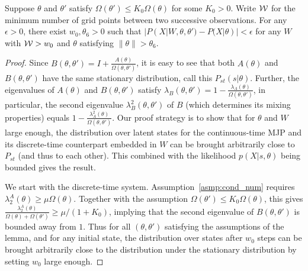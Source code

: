\begin{lemma}
Suppose $\theta$ and $\theta'$ satisfy $\Omega(\theta') \leq K_0
\Omega(\theta)$ for some $K_0 > 0$. Write ${\mathcal W}$ for the
minimum number of grid points between two successive observations.
For any $\epsilon > 0$, there exist  $w_0, \theta_6 > 0$ such that
$|P(X| W, \theta, \theta') - P(X | \theta)| < \epsilon$
for any $W$ with ${\mathcal W} > w_0$ and $\theta $ satisfying $\parallel \theta \parallel > \theta_6$.
\label{lem:eigenvalue_lemma}
\end{lemma}
\begin{proof}
Since $B(\theta, \theta') = I+\frac{A(\theta)}{\Omega(\theta, \theta')}$,
it is easy to see that both $A(\theta)$ and $B(\theta,\theta')$ have
the same stationary distribution, call this $P_{st}(s|\theta)$. Further,
the eigenvalues of $A(\theta)$ and $B(\theta,\theta')$ satisfy
$\lambda_B(\theta, \theta') = 1 - \frac{\lambda_A(\theta)}{\Omega(\theta,
\theta')}$, in particular, the second eigenvalue
$\lambda^2_B(\theta,\theta')$ of $B$ (which determines its mixing
properties) equals $1 - \frac{\lambda^2_A(\theta)}{\Omega(\theta, \theta')}$.
Our proof strategy is to show that for $\theta$ and $W$ large enough, the
distribution over latent states for the continuous-time MJP and
its discrete-time counterpart embedded in $W$ can be brought arbitrarily
close to $P_{st}$ (and thus to each other). This combined with the
likelihood $p(X|s, \theta)$ being bounded  gives the result.

We start with the discrete-time system.
Assumption~\ref{asmp:cond_num} requires
$\lambda^A_2(\theta) \geq \mu \Omega(\theta)$.
Together with the assumption $\Omega(\theta') \leq K_0 \Omega(\theta)$,
this gives
$\frac{\lambda^A_2(\theta)}{\Omega(\theta) + \Omega(\theta')} \geq
\mu / (1 + K_0) $, implying that the second eigenvalue of
$B(\theta, \theta')$ is bounded away from $1$.
Thus for all $(\theta,\theta')$ satisfying the assumptions of the lemma,
and for any initial state, the distribution over states after $w_0$ steps
can be brought arbitrarily close to the distribution under the
stationary distribution by setting $w_0$ large enough.



\end{proof}
